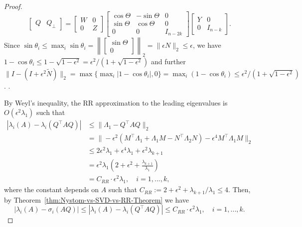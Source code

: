 \documentclass[10pt,a4paper]{amsart}
\begin{document}
\begin{proof}
{\[
    \begin{bmatrix}
        Q & Q_{\perp}
    \end{bmatrix}
    =
    \begin{bmatrix}
        W & 0 \\
        0 & Z
    \end{bmatrix}
    \begin{bmatrix}
        \cos \Theta & -\sin \Theta & 0 \\
        \sin \Theta & \cos \Theta & 0 \\
        0 & 0 & I_{n-2k}
    \end{bmatrix}
    \begin{bmatrix}
        Y & 0 \\
        0 & I_{n-k}
    \end{bmatrix}.
\]
Since $\sin \theta_i \leq \max_i \sin \theta_i = \left\|
\begin{bmatrix}
    \sin \Theta \\
    0
\end{bmatrix}
\right\|_2 = \|\epsilon N\|_2 \leq \epsilon$, we have $1 - \cos \theta_i \leq 1 - \sqrt{1-\epsilon^2} = \epsilon^2 / (1 + \sqrt{1-\epsilon^2})$ and further $\|I - (I + \epsilon^2 \widetilde{N})\|_2 = \max\{\max_i|1 - \cos \theta_i|, 0\} = \max_i (1 - \cos \theta_i) \leq \epsilon^2 / (1 + \sqrt{1-\epsilon^2})$.
}.

By Weyl's inequality, the RR approximation to the leading eigenvalues is $O(\epsilon^2 \lambda_1)$ such that
\[
    \begin{aligned}
        \left|\lambda_{i}(A) - \lambda_{i}\left(Q^\top A Q\right)\right| & \leq \|\Lambda_1 - Q^\top A Q\|_2 \\ 
        & = \|-\epsilon^2 \left(M^\top \Lambda_1 + \Lambda_1 M - N^\top \Lambda_2 N\right) - \epsilon^4 M^\top \Lambda_1 M\|_2 \\
        & \leq 2 \epsilon^2 \lambda_1 + \epsilon^4 \lambda_1 + \epsilon^2 \lambda_{k+1} 
        \\
        & = \epsilon^2 \lambda_1 \left(2 + \epsilon^2 + \frac{\lambda_{k+1}}{\lambda_1}\right) \\
        & = C_{RR} \cdot \epsilon^2 \lambda_1, \quad i=1,...,k,
    \end{aligned}
\]
where the constant depends on $A$ such that $C_{RR} := 2 + \epsilon^2 + \lambda_{k+1} / \lambda_1 \leq 4$.
Then, by Theorem~\ref{thm:Nystom-vs-SVD-vs-RR-Theorem} we have
\[
    \left|\lambda_{i}(A) - \sigma_{i}\left(A Q\right)\right| \leq \left|\lambda_{i}(A) - \lambda_{i}\left(Q^\top A Q\right)\right| \leq C_{RR} \cdot \epsilon^2 \lambda_1, \quad i=1,...,k.
\]


\end{proof}
\end{document}
